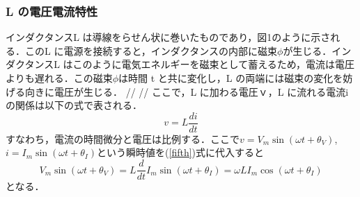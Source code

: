 \documentclass{ujarticle}
\begin{document}
\subsubsection{L の電圧電流特性}
インダクタンスL は導線をらせん状に巻いたものであり，図1のように示される．このL に電源を接続すると，インダクタンスの内部に磁束$\phi$が生じる．インダクタンスL はこのように電気エネルギーを磁束として蓄えるため，電流は電圧よりも遅れる．この磁束$\phi$は時間 t と共に変化し，L の両端には磁束の変化を妨げる向きに電圧が生じる．
//
//
ここで，L に加わる電圧ｖ，L に流れる電流i の関係は以下の式で表される．
\begin{equation}
\label{fifth}
v = L\frac{di}{dt}
\end{equation}
すなわち，電流の時間微分と電圧は比例する．ここで$v = V_{m}\sin(\omega t + \theta_{V})$,$i = I_{m}\sin(\omega t + \theta_{I})$という瞬時値を(\ref{fifth})式に代入すると
\begin{equation}
\label{sixth}
V_{m}\sin(\omega t + \theta_{V})=L\frac{d}{dt} {I_{m}\sin(\omega t + \theta_{I}) } = \omega LI_{m}\cos(\omega t + \theta_{I})
\end{equation}
となる．
\end{document}
